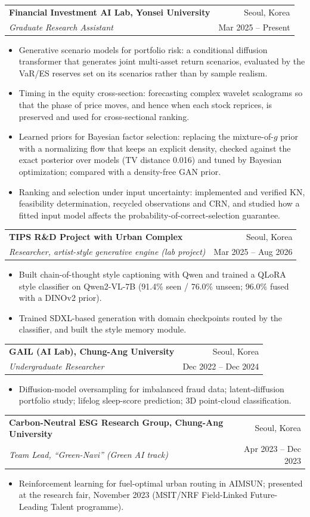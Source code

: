 \documentclass[11pt]{article}
\makeatletter
\newcommand{\cvsection}[1]{\par\addvspace{14pt}{\large\scshape\color{accent}#1\strut\par}\nopagebreak\vskip 5.9pt\relax\@afterheading}
\newcommand{\entry}[4]{\par\noindent\begin{tabular*}{\textwidth}[t]{@{}l@{\extracolsep{\fill}}r@{}}\textbf{#1} & #2\\ \textit{#3} & #4\end{tabular*}\par}
\makeatother
\begin{document}
\cvsection{Research Experience}
\entry{Financial Investment AI Lab, Yonsei University}{Seoul, Korea}{Graduate Research Assistant}{Mar 2025 -- Present}
\begin{itemize}
\item Generative scenario models for portfolio risk: a conditional diffusion transformer that generates joint multi-asset return scenarios, evaluated by the VaR/ES reserves set on its scenarios rather than by sample realism.
\item Timing in the equity cross-section: forecasting complex wavelet scalograms so that the phase of price moves, and hence when each stock reprices, is preserved and used for cross-sectional ranking.
\item Learned priors for Bayesian factor selection: replacing the mixture-of-$g$ prior with a normalizing flow that keeps an explicit density, checked against the exact posterior over models (TV distance 0.016) and tuned by Bayesian optimization; compared with a density-free GAN prior.
\item Ranking and selection under input uncertainty: implemented and verified KN, feasibility determination, recycled observations and CRN, and studied how a fitted input model affects the probability-of-correct-selection guarantee.
\end{itemize}
\vspace{4pt}
\entry{TIPS R\&D Project with Urban Complex}{Seoul, Korea}{Researcher, artist-style generative engine (lab project)}{Mar 2025 -- Aug 2026}
\begin{itemize}
\item Built chain-of-thought style captioning with Qwen and trained a QLoRA style classifier on Qwen2-VL-7B (91.4\% seen / 76.0\% unseen; 96.0\% fused with a DINOv2 prior).
\item Trained SDXL-based generation with domain checkpoints routed by the classifier, and built the style memory module.
\end{itemize}
\vspace{4pt}
\entry{GAIL (AI Lab), Chung-Ang University}{Seoul, Korea}{Undergraduate Researcher}{Dec 2022 -- Dec 2024}
\begin{itemize}
\item Diffusion-model oversampling for imbalanced fraud data; latent-diffusion portfolio study; lifelog sleep-score prediction; 3D point-cloud classification.
\end{itemize}
\vspace{4pt}
\entry{Carbon-Neutral ESG Research Group, Chung-Ang University}{Seoul, Korea}{Team Lead, ``Green-Navi'' (Green AI track)}{Apr 2023 -- Dec 2023}
\begin{itemize}
\item Reinforcement learning for fuel-optimal urban routing in AIMSUN; presented at the research fair, November 2023 (MSIT/NRF Field-Linked Future-Leading Talent programme).
\end{itemize}
\end{document}
